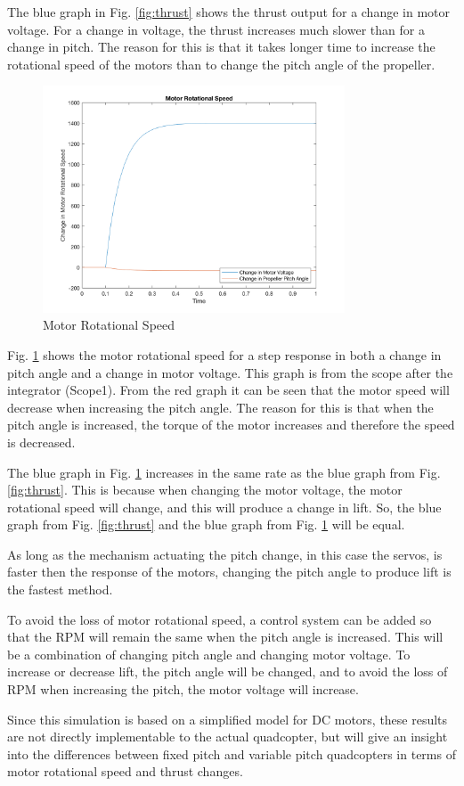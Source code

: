 The blue graph in Fig. \ref{fig:thrust} shows the thrust output for a change in motor voltage. For a change in voltage, the thrust increases much slower than for a change in pitch. The reason for this is that it takes longer time to increase the rotational speed of the motors than to change the pitch angle of the propeller. \bigskip

\begin{figure}[H]
    \centering
    \includegraphics[width = 0.8\textwidth]{VAPIQ-PICTURES/motrotspeed.png}
    \caption{Motor Rotational Speed}
    \label{fig:speed}
\end{figure}\bigskip

Fig. \ref{fig:speed} shows the motor rotational speed for a step response in both a change in pitch angle and a change in motor voltage. This graph is from the scope after the integrator (Scope1). From the red graph it can be seen that the motor speed will decrease when increasing the pitch angle. The reason for this is that when the pitch angle is increased, the torque of the motor increases and therefore the speed is decreased. \bigskip

The blue graph in Fig. \ref{fig:speed} increases in the same rate as the blue graph from Fig. \ref{fig:thrust}. This is because when changing the motor voltage, the motor rotational speed will change, and this will produce a change in lift. So, the blue graph from Fig. \ref{fig:thrust} and the blue graph from Fig. \ref{fig:speed} will be equal. \bigskip

As long as the mechanism actuating the pitch change, in this case the servos, is faster then the response of the motors, changing the pitch angle to produce lift is the fastest method. \bigskip

To avoid the loss of motor rotational speed, a control system can be added so that the RPM will remain the same when the pitch angle is increased. This will be a combination of changing pitch angle and changing motor voltage. To increase or decrease lift, the pitch angle will be changed, and to avoid the loss of RPM when increasing the pitch, the motor voltage will increase. \bigskip

Since this simulation is based on a simplified model for DC motors, these results are not directly implementable to the actual quadcopter, but will give an insight into the differences between fixed pitch and variable pitch quadcopters in terms of motor rotational speed and thrust changes. 

